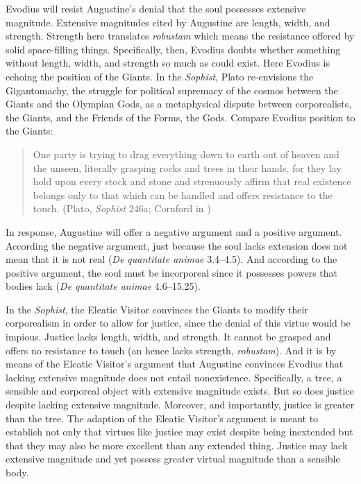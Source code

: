 \documentclass[12pt]{article}
\begin{document}
Evodius will resist Augustine’s denial that the soul possesses extensive magnitude. Extensive magnitudes cited by Augustine are length, width, and strength. Strength here translates \emph{robustam} which means the resistance offered by solid space-filling things. Specifically, then, Evodius doubts whether something without length, width, and strength so much as could exist. Here Evodius is echoing the position of the Giants. In the \emph{Sophist}, Plato re-envisions the Gigantomachy, the struggle for political supremacy of the cosmos between the Giants and the Olympian Gods, as a metaphysical dispute between corporealists, the Giants, and the Friends of the Forms, the Gods. Compare Evodius position to the Giants:
\begin{quote}
	One party is trying to drag everything down to earth out of heaven and the unseen, literally grasping rocks and trees in their hands, for they lay hold upon every stock and stone and strenuously affirm that real existence belongs only to that which can be handled and offers resistance to the touch. (Plato, \emph{Sophist} 246a; Cornford in \citealt[990]{Hamilton:1989fk})
\end{quote}
	

In response, Augustine will offer a negative argument and a positive argument. According the negative argument, just because the soul lacks extension does not mean that it is not real (\emph{De quantitate animae} 3.4–4.5). And according to the positive argument, the soul must be incorporeal since it possesses powers that bodies lack (\emph{De quantitate animae} 4.6–15.25).

In the \emph{Sophist}, the Eleatic Visitor convinces the Giants to modify their corporealism in order to allow for justice, since the denial of this virtue would be impious. Justice lacks length, width, and strength. It cannot be grasped and offers no resistance to touch (an hence lacks strength, \emph{robustam}). And it is by means of the Eleatic Visitor’s argument that Augustine convinces Evodius that lacking extensive magnitude does not entail nonexistence. Specifically, a tree, a sensible and corporeal object with extensive magnitude exists. But so does justice despite lacking extensive magnitude. Moreover, and importantly, justice is greater than the tree. The adaption of the Eleatic Visitor’s argument is meant to establish not only that virtues like justice may exist despite being inextended but that they may also be more excellent than any extended thing. Justice may lack extensive magnitude and yet possess greater virtual magnitude than a sensible body. 
\end{document}
